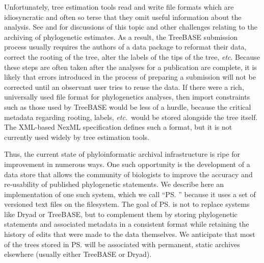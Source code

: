 Unfortunately, tree estimation tools read and write file formats which are idiosyncratic and often so 
    terse that they omit useful information about the analysis.
See \citet{StoltzfusEtAl2012} and \citet{Cranston2014} for discussions
    of this topic and other challenges relating to the archiving of phylogenetic estimates.
As a result, the TreeBASE submission process usually requires the authors of a data package to reformat their data, correct
    the rooting of the tree, alter the labels of the tips of the tree, {\em etc}.
Because these steps are often taken after the analyses for a publication are complete, it is likely that
    errors introduced in the process of preparing a submission will not be corrected until an observant user tries to reuse the data.
If there were a rich, universally used file format for phylogenetics analyses, then import constraints such as those
used by TreeBASE would be less of a hurdle, because the critical metadata regarding rooting, labels, {\em etc.~}would be
    stored alongside the tree itself.
The XML-based NexML specification \citep{NeXML} defines such a format, but it is not currently  used widely by tree estimation tools.


Thus, the current state of phyloinformatic archival infrastructure is ripe for improvement in numerous ways.
One such opportunity is the development of a data store that allows the community of biologists to improve the
    accuracy and re-usability of published phylogenetic statements.
We describe here an implementation of one such system, which we call ``\ps'' because it uses a set of
    versioned text files on the filesystem. %
The goal of \ps is not to replace systems like Dryad or TreeBASE, but to complement them by 
    storing phylogenetic statements and associated metadata in a consistent format while retaining the history of
    edits that were made to the data themselves.
We anticipate that most of the trees stored in \ps will be associated with permanent, static archives
    elsewhere (usually either TreeBASE or Dryad).


